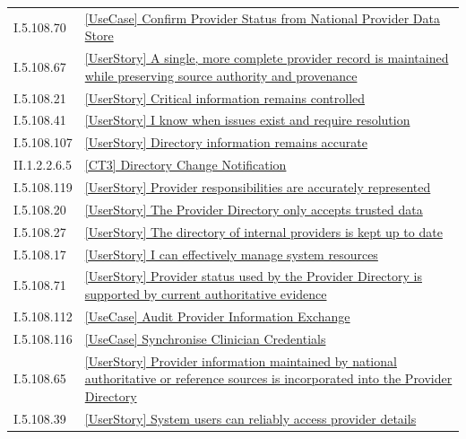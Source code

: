 \begin{longtable}{p{.22\linewidth}p{.73\linewidth}}
I.5.108.70 & \hyperref[element:97d1d0ff44db46879cf57ff55caee9d6]{[UseCase] Confirm Provider Status from National Provider Data Store} \\
I.5.108.67 & \hyperref[element:9ad1c92261004c10be3562747ba8f09c]{[UserStory] A single, more complete provider record is maintained while preserving source authority and provenance} \\
I.5.108.21 & \hyperref[element:9c930967dbd9404baf961c1ce2baf40e]{[UserStory] Critical information remains controlled} \\
I.5.108.41 & \hyperref[element:a0ce437682614dc4b87a74b10340b486]{[UserStory] I know when issues exist and require resolution} \\
I.5.108.107 & \hyperref[element:a19054def38c467c9012aebbc93ed319]{[UserStory] Directory information remains accurate} \\
II.1.2.2.6.5 & \hyperref[element:a633f3a1cba049a0b427c5f1854e5e82]{[CT3] Directory Change Notification} \\
I.5.108.119 & \hyperref[element:a85ed72bdebb456f84d502b9a2abeac3]{[UserStory] Provider responsibilities are accurately represented} \\
I.5.108.20 & \hyperref[element:a95a0b5cd40e4e45a34d92a806e0c86b]{[UserStory] The Provider Directory only accepts trusted data} \\
I.5.108.27 & \hyperref[element:b651e3dd81c04a40a5701165d2bfac49]{[UserStory] The directory of internal providers is kept up to date} \\
I.5.108.17 & \hyperref[element:b77563311cdb46adafc20609bf127ade]{[UserStory] I can effectively manage system resources} \\
I.5.108.71 & \hyperref[element:b84675324c7b427daa60f328078db37a]{[UserStory] Provider status used by the Provider Directory is supported by current authoritative evidence} \\
I.5.108.112 & \hyperref[element:b9e02f26483046c5b64353823ef27c59]{[UseCase] Audit Provider Information Exchange} \\
I.5.108.116 & \hyperref[element:ba1a0296cbcd4252baf4464382bf4625]{[UseCase] Synchronise Clinician Credentials} \\
I.5.108.65 & \hyperref[element:bc967946471a4f818bb9bff4635c92ab]{[UserStory] Provider information maintained by national authoritative or reference sources is incorporated into the Provider Directory} \\
I.5.108.39 & \hyperref[element:c197fd8b26884bb09050491bd26d5a40]{[UserStory] System users can reliably access provider details} \\

\end{longtable}
